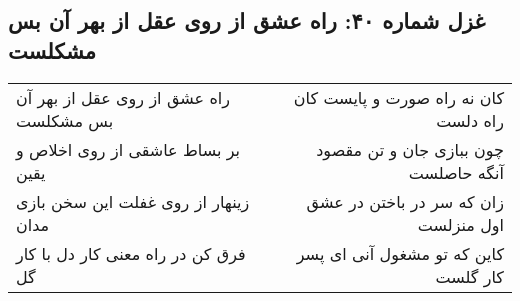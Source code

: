 \begin{center}
\section*{غزل شماره ۴۰: راه عشق از روی عقل از بهر آن بس مشکلست}
\label{sec:040}
\begin{longtable}{l p{0.5cm} r}
راه عشق از روی عقل از بهر آن بس مشکلست
&&
کان نه راه صورت و پایست کان راه دلست
\\
بر بساط عاشقی از روی اخلاص و یقین
&&
چون ببازی جان و تن مقصود آنگه حاصلست
\\
زینهار از روی غفلت این سخن بازی مدان
&&
زان که سر در باختن در عشق اول منزلست
\\
فرق کن در راه معنی کار دل با کار گل
&&
کاین که تو مشغول آنی ای پسر کار گلست
\\
\end{longtable}
\end{center}
